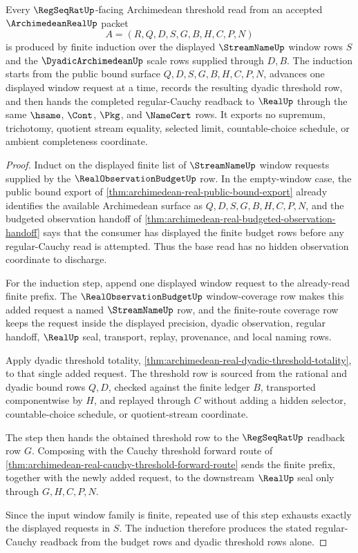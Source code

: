 \begin{theorem}
\label{thm:archimedean-real-regular-cauchy-induction-readback}
Every $\RegSeqRatUp$-facing Archimedean threshold read from an accepted $\ArchimedeanRealUp$ packet
$$
A=(R,Q,D,S,G,B,H,C,P,N)
$$
is produced by finite induction over the displayed $\StreamNameUp$ window rows $S$ and the $\DyadicArchimedeanUp$ scale rows supplied through $D,B$. The induction starts from the public bound surface $Q,D,S,G,B,H,C,P,N$, advances one displayed window request at a time, records the resulting dyadic threshold row, and then hands the completed regular-Cauchy readback to $\RealUp$ through the same $\hsame$, $\Cont$, $\Pkg$, and $\NameCert$ rows. It exports no supremum, trichotomy, quotient stream equality, selected limit, countable-choice schedule, or ambient completeness coordinate.
\end{theorem}
\begin{proof}
Induct on the displayed finite list of $\StreamNameUp$ window requests supplied by the $\RealObservationBudgetUp$ row. In the empty-window case, the public bound export of \autoref{thm:archimedean-real-public-bound-export} already identifies the available Archimedean surface as $Q,D,S,G,B,H,C,P,N$, and the budgeted observation handoff of \autoref{thm:archimedean-real-budgeted-observation-handoff} says that the consumer has displayed the finite budget rows before any regular-Cauchy read is attempted. Thus the base read has no hidden observation coordinate to discharge.

For the induction step, append one displayed window request to the already-read finite prefix. The $\RealObservationBudgetUp$ window-coverage row makes this added request a named $\StreamNameUp$ row, and the finite-route coverage row keeps the request inside the displayed precision, dyadic observation, regular handoff, $\RealUp$ seal, transport, replay, provenance, and local naming rows.

Apply dyadic threshold totality, \autoref{thm:archimedean-real-dyadic-threshold-totality}, to that single added request. The threshold row is sourced from the rational and dyadic bound rows $Q,D$, checked against the finite ledger $B$, transported componentwise by $H$, and replayed through $C$ without adding a hidden selector, countable-choice schedule, or quotient-stream coordinate.

The step then hands the obtained threshold row to the $\RegSeqRatUp$ readback row $G$. Composing with the Cauchy threshold forward route of \autoref{thm:archimedean-real-cauchy-threshold-forward-route} sends the finite prefix, together with the newly added request, to the downstream $\RealUp$ seal only through $G,H,C,P,N$.

Since the input window family is finite, repeated use of this step exhausts exactly the displayed requests in $S$. The induction therefore produces the stated regular-Cauchy readback from the budget rows and dyadic threshold rows alone.
\end{proof}

